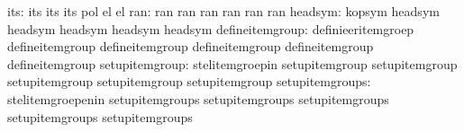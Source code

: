                              its: its                              its
                                  its                              pol %
                                  el                               el  %
                             ran: ran                              ran
                                  ran                              ran
                                  ran                              ran
                         headsym: kopsym                           headsym
                                  headsym                          headsym
                                  headsym                          headsym
                 defineitemgroup: definieeritemgroep               defineitemgroup
                                  defineitemgroup                  defineitemgroup
                                  defineitemgroup                  defineitemgroup
                  setupitemgroup: stelitemgroepin                  setupitemgroup
                                  setupitemgroup                   setupitemgroup
                                  setupitemgroup                   setupitemgroup
                 setupitemgroups: stelitemgroepenin                setupitemgroups
                                  setupitemgroups                  setupitemgroups
                                  setupitemgroups                  setupitemgroups



